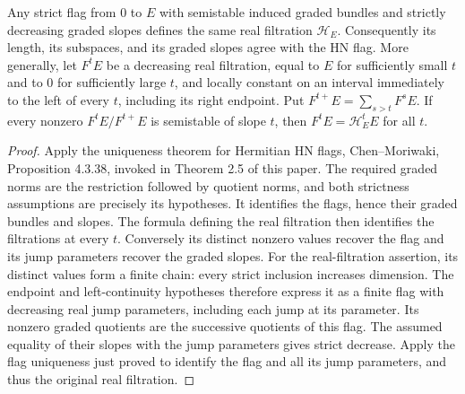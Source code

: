 \begin{lemma}
\label{lem:hn-uniqueness}
\leanok
Any strict flag from $0$ to $E$ with semistable induced graded bundles
and strictly decreasing graded slopes defines the same real filtration
$\mathcal H_E$. Consequently its length, its subspaces, and its graded
slopes agree with the HN flag.
More generally, let $F^tE$ be a decreasing real filtration, equal to $E$
for sufficiently small $t$ and to $0$ for sufficiently large $t$, and
locally constant on an interval immediately to the left of every $t$,
including its right endpoint. Put
$F^{t+}E=\sum_{s>t}F^sE$. If every nonzero
$F^tE/F^{t+}E$ is semistable of slope $t$, then $F^tE=\mathcal H_E^tE$
for all $t$.
\end{lemma}
\begin{proof}
Apply the uniqueness theorem for Hermitian HN flags,
Chen--Moriwaki, Proposition 4.3.38, invoked in Theorem 2.5 of this paper.
The required graded norms are the restriction followed by quotient
norms, and both strictness assumptions are precisely its hypotheses.
It identifies the flags, hence their graded bundles and slopes. The
formula defining the real filtration then identifies the filtrations
at every $t$. Conversely its distinct nonzero values recover the flag
and its jump parameters recover the graded slopes.
For the real-filtration assertion, its distinct values form a finite
chain: every strict inclusion increases dimension. The endpoint and
left-continuity hypotheses therefore express it as a finite flag
with decreasing real jump parameters, including each jump at its
parameter. Its nonzero graded quotients are the successive quotients
of this flag. The assumed equality of their slopes with the jump
parameters gives strict decrease. Apply the flag uniqueness just proved
to identify the flag and all its jump parameters, and thus the original
real filtration.
\end{proof}

